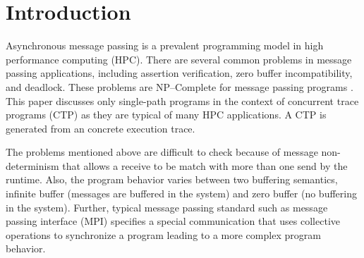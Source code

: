 \section{Introduction}
Asynchronous message passing is a prevalent programming model in high performance computing (HPC). There are several common problems in message passing applications, including assertion verification, zero buffer incompatibility, and deadlock. These problems are NP--Complete for message passing programs \cite{DBLP:conf/kbse/HuangMM13,HuangNFM15,HuangDeadlock}. This paper discusses only single-path programs in the context of concurrent trace programs (CTP) as they are typical of many HPC applications. A CTP is generated from an concrete execution trace.

The problems mentioned above are difficult to check because of message non-determinism that allows a receive to be match with more than one send by the runtime. Also, the program behavior varies between two buffering semantics, infinite buffer (messages are buffered in the system) and zero buffer (no buffering in the system). Further, typical message passing standard such as message passing interface (MPI) specifies a special communication that uses collective operations to synchronize a program leading to a more complex program behavior. 


